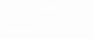 \documentclass[preview,convert={density=600,outext=.png,command=\unexpanded{ {\convertexe\space -density \density\space\infile\space \ifx\size\empty\else -resize \size\fi\space -quality 90 -trim +repage -background "rgba(50,50,50,0.5)" -bordercolor "rgba(50,50,50,0.5)" -border 25 -flatten \outfile} } }]{standalone}
\begin{document}
\begin{center}
\textcolor{white}{
This also holds in the \\
"London" version of the \\
painting \\}
\end{center}
\end{document}

